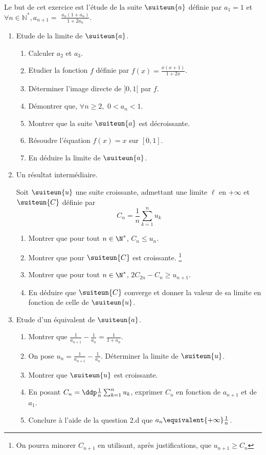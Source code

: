 \documentclass[a4paper, 11pt,reqno]{article}
\begin{document}
\begin{exercice}
Le but de cet exercice est l'étude de  la suite $\suiteun{a}$ définie par $a_{1}=1$ et $\forall n \in \mathbb{N}^{*}, a_{n+1}=$ $\frac{a_{n}\left(1+a_{n}\right)}{1+2 a_{n}} .$

\begin{enumerate}
\item Etude de la limite de $\suiteun{a}$.
\begin{enumerate}

\item  Calculer $a_{2}$ et $a_{3}$.
\item Etudier la fonction $f$ définie par  $f(x) =\frac{x(x+1)}{1+2x}$.
\item Déterminer l'image directe de $]0,1[$ par $f$. 
\item  Démontrer que, $\forall n \geqslant 2,$ $0<a_{n}<1$.
\item Montrer que la suite $\suiteun{a}$ est décroissante.
\item Résoudre l'équation $f(x)=x$ sur $[0,1]$. 
\item En déduire la limite de $\suiteun{a}$.
\end{enumerate}
\item Un résultat intermédiaire. 

Soit $\suiteun{u} $ une suite croissante, admettant une limite $\ell$ en $+\infty$ et $\suiteun{C}$ définie par 
$$C_n=\frac{1}{n}\sum_{k=1}^n  u_k$$
\begin{enumerate}
\item Montrer que pour tout $n\in \N^*$, $C_n\leq u_n$. 
\item  Montrer que pour $\suiteun{C}$ est croissante. 
\footnote{On pourra minorer $C_{n+1}$ en utilisant, après justifications, que $u_{n+1}\geq C_{n}$}
\item Montrer que pour tout $n\in \N^*$, $2C_{2n}-C_n \geq u_{n+1}$. 
\item En déduire que $\suiteun{C}$ converge et donner la valeur de sa limite en fonction de celle de $\suiteun{u}$. 

\end{enumerate}
\item Etude d'un équivalent de $\suiteun{a}$.
\begin{enumerate}
\item Montrer que $\frac{1}{a_{n+1}}-\frac{1}{a_{n}}=\frac{1}{1+a_{n}}$.
\item On pose $u_{n}=\frac{1}{a_{n+1}}-\frac{1}{a_{n}} .$ Déterminer la limite de $\suiteun{u}$.
\item Montrer que $\suiteun{u}$ est croissante. 
\item En posant $C_{n}=\ddp \frac{1}{n} \sum_{k=1}^{n} u_{k}$, exprimer $C_{n}$ en fonction de $a_{n+1}$ et de $a_{1}$.
\item Conclure à l'aide de la question 2.d que $a_n \equivalent{+\infty} \frac{1}{n}$.
\end{enumerate}
\end{enumerate}


\end{exercice}
\end{document}
